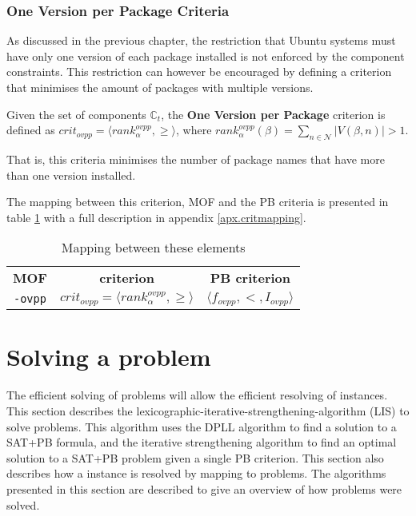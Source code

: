 \subsubsection{One Version per Package Criteria}
\label{impl.ipp}
As discussed in the previous chapter, the restriction that Ubuntu systems must have only one version of each package installed is not enforced by the component constraints.
This restriction can however be encouraged by defining a criterion that minimises the amount of packages with multiple versions.

\begin{defs}
	Given the set of components $\mathbb{C}_t$, the \textbf{One Version per Package} criterion is defined as $crit_{ovpp} = \langle rank^{ovpp}_{\alpha}, \geq \rangle$,
	where $rank^{ovpp}_{\alpha}(\beta) = \sum_{n \in \mathcal{N}} |V(\beta,n)| > 1$.
\end{defs}
That is, this criteria minimises the number of package names that have more than one version installed.

The mapping between this criterion, MOF and the PB criteria is presented in table \ref{impl.mcritmapping} with a full description in appendix \ref{apx.critmapping}.
\begin{table}
\begin{tabular}{c | c | c}
\textbf{MOF} 		& \textbf{\modelname criterion} & \textbf{PB criterion} \\
\texttt{-ovpp} 	& $crit_{ovpp} = \langle rank^{ovpp}_{\alpha}, \geq \rangle$ & $\langle f_{ovpp}, <, I_{ovpp} \rangle$ \\
\end{tabular}
\caption{Mapping between these elements}
\label{impl.mcritmapping}
\end{table}

\section{Solving a \modelimpl problem}
\label{impl.algorithms}
The efficient solving of \modelimpl problems will allow the efficient resolving of \modelname instances.
This section describes the lexicographic-iterative-strengthening-algorithm (LIS) to solve \modelimpl problems.
This algorithm uses the DPLL algorithm \citep{Davis1960, davis1962machine} to find a solution to a SAT+PB formula,
and the iterative strengthening algorithm \citep{calistri1994iterative, le2010sat4j} to find an optimal solution to a SAT+PB problem given a single PB criterion.
This section also describes how a \modelname instance is resolved by mapping to \modelimpl problems.
The algorithms presented in this section are described to give an overview of how \modelimpl problems were solved.

